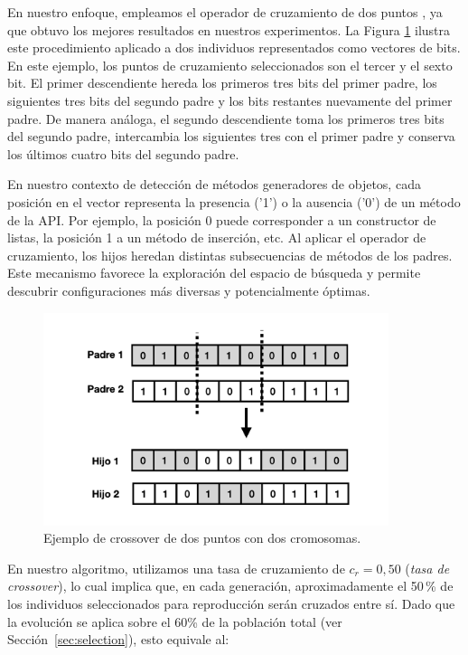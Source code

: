 En nuestro enfoque, empleamos el operador de cruzamiento de dos puntos \cite{goldberg1989genetic}, ya que obtuvo los mejores resultados en nuestros experimentos.  
La Figura \ref{fig:crossover} ilustra este procedimiento aplicado a dos individuos representados como vectores de bits.  
En este ejemplo, los puntos de cruzamiento seleccionados son el tercer y el sexto bit.  
El primer descendiente hereda los primeros tres bits del primer padre, los siguientes tres bits del segundo padre y los bits restantes nuevamente del primer padre.  
De manera análoga, el segundo descendiente toma los primeros tres bits del segundo padre, intercambia los siguientes tres con el primer padre y conserva los últimos cuatro bits del segundo padre.  

En nuestro contexto de detección de métodos generadores de objetos, cada posición en el vector representa la presencia ('1') o la ausencia ('0') de un método de la API.  
Por ejemplo, la posición 0 puede corresponder a un constructor de listas, la
posición 1 a un método de inserción, etc.  
Al aplicar el operador de cruzamiento, los hijos heredan distintas subsecuencias de métodos
de los padres. Este mecanismo favorece la exploración del espacio de búsqueda y permite descubrir configuraciones más diversas y potencialmente óptimas. 

\begin{figure}
  \centering
  \includegraphics[width=0.9\textwidth]{images/crossOver.png}
  \caption{Ejemplo de crossover de dos puntos con dos cromosomas.}
  \label{fig:crossover}
\end{figure}


En nuestro algoritmo, utilizamos una tasa de cruzamiento de \( c_r = 0{,}50 \) (\emph{tasa de crossover}), 
lo cual implica que, en cada generación, aproximadamente el 50\,\% de los individuos seleccionados para reproducción serán cruzados entre sí.  
Dado que la evolución se aplica sobre el 60\% de la población total (ver Sección~\ref{sec:selection}), esto equivale al:

